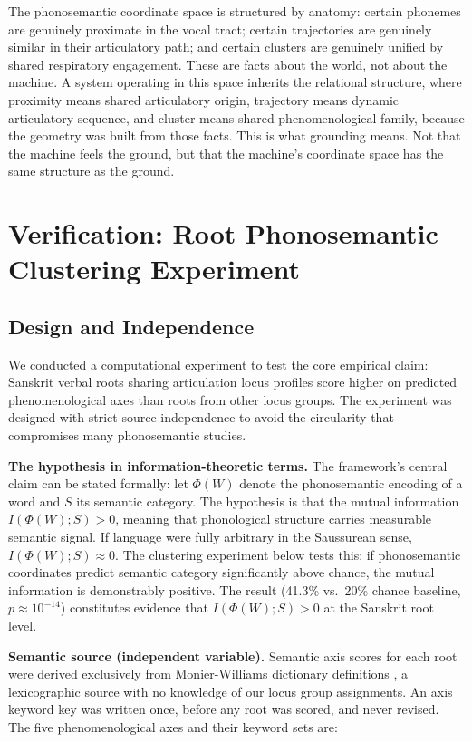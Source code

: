 \documentclass[12pt]{article}
\begin{document}
The phonosemantic coordinate space is structured by anatomy: certain phonemes are genuinely proximate in the vocal tract; certain trajectories are genuinely similar in their articulatory path; and certain clusters are genuinely unified by shared respiratory engagement. These are facts about the world, not about the machine. A system operating in this space inherits the relational structure, where proximity means shared articulatory origin, trajectory means dynamic articulatory sequence, and cluster means shared phenomenological family, because the geometry was built from those facts. This is what grounding means. Not that the machine feels the ground, but that the machine's coordinate space has the same structure as the ground.


\section{Verification: Root Phonosemantic Clustering Experiment}

\subsection{Design and Independence}

We conducted a computational experiment to test the core empirical claim: Sanskrit verbal roots sharing articulation locus profiles score higher on predicted phenomenological axes than roots from other locus groups. The experiment was designed with strict source independence to avoid the circularity that compromises many phonosemantic studies.

\textbf{The hypothesis in information-theoretic terms.} The framework's central claim can be stated formally: let $\Phi(W)$ denote the phonosemantic encoding of a word and $S$ its semantic category. The hypothesis is that the mutual information $I(\Phi(W); S) > 0$, meaning that phonological structure carries measurable semantic signal. If language were fully arbitrary in the Saussurean sense, $I(\Phi(W); S) \approx 0$. The clustering experiment below tests this: if phonosemantic coordinates predict semantic category significantly above chance, the mutual information is demonstrably positive. The result (41.3\% vs.~20\% chance baseline, $p \approx 10^{-14}$) constitutes evidence that $I(\Phi(W); S) > 0$ at the Sanskrit root level.

\textbf{Semantic source (independent variable).} Semantic axis scores for each root were derived exclusively from Monier-Williams dictionary definitions \cite{monierw1899}, a lexicographic source with no knowledge of our locus group assignments. An axis keyword key was written once, before any root was scored, and never revised. The five phenomenological axes and their keyword sets are:
\end{document}
